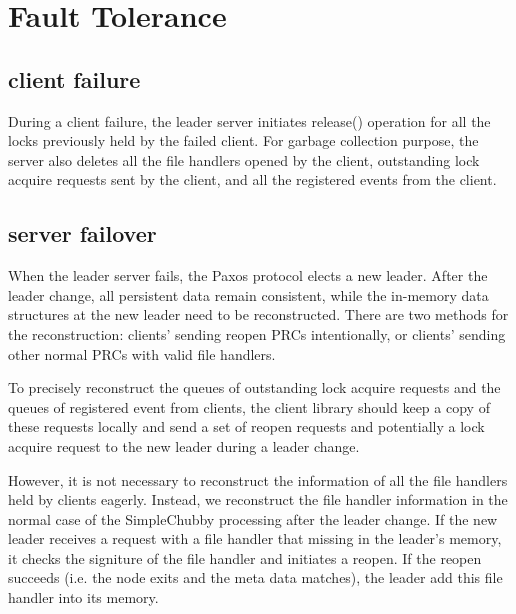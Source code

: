 \section{Fault Tolerance}
\subsection{client failure}

During a client failure, the leader server initiates release() operation for
all the locks previously held by the failed client. For garbage collection
purpose, the server also deletes all the file handlers opened by the client,
outstanding lock acquire requests sent by the client, and all the registered
events from the client.


\subsection{server failover}

When the leader server fails, the Paxos protocol elects a new leader. After
the leader change, all persistent data remain consistent, while the in-memory
data structures at the new leader need to be reconstructed. There are two
methods for the reconstruction: clients' sending reopen PRCs intentionally,
or clients' sending other normal PRCs with valid file handlers.

To precisely reconstruct the queues of outstanding lock acquire requests and
the queues of registered event from clients, the client library should keep
a copy of these requests locally and send a set of reopen requests and
potentially a lock acquire request to the new leader during a leader change.

However, it is not necessary to reconstruct the information of all the file
handlers held by clients eagerly. Instead, we reconstruct the file handler
information in the normal case of the SimpleChubby processing after the
leader change. If the new leader receives a request with a file handler that
missing in the leader's memory, it checks the signiture of the file
handler and initiates a reopen. If the reopen succeeds (i.e. the node exits
and the meta data matches), the leader add this file handler into its memory.
